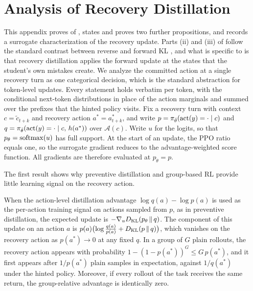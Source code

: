 \section{Analysis of Recovery Distillation}
\label{app:theory}

This appendix proves  of , states and proves two further propositions, and records a surrogate characterization of the recovery update. Parts (ii) and (iii) of  follow the standard contrast between reverse and forward KL \citep{agarwal2024gkd,gu2024minillm}, and what is specific to \method{} is that recovery distillation applies the forward update at the states that the student's own mistakes create. We analyze the committed action at a single recovery turn as one categorical decision, which is the standard abstraction for token-level updates. Every statement holds verbatim per token, with the conditional next-token distributions in place of the action marginals and summed over the prefixes that the hinted policy visits. Fix a recovery turn with context $c = \tilde{c}_{t+k}$ and recovery action $a^{*} = a^{*}_{t+k}$, and write $p = \pi_{\bar\theta}(\operatorname{act}(y) = \cdot \mid c)$ and $q = \pi_{\bar\theta}(\operatorname{act}(y) = \cdot \mid c,\, h(a^{*}))$ over $\mathcal{A}(c)$. Write $u$ for the logits, so that $p_\theta = \mathrm{softmax}(u)$ has full support. At the start of an update, the PPO ratio equals one, so the surrogate gradient reduces to the advantage-weighted score function. All gradients are therefore evaluated at $p_\theta = p$.

The first result shows why preventive distillation and group-based RL provide little learning signal on the recovery action.

\begin{proposition}
\label{prop:starvation}
When the action-level distillation advantage $\log q(a) - \log p(a)$ is used as the per-action training signal on actions sampled from $p$, as in preventive distillation, the expected update is $-\nabla_u D_{\mathrm{KL}}(p_\theta \,\|\, q)$. The component of this update on an action $a$ is $p(a)\bigl(\log\tfrac{q(a)}{p(a)} + D_{\mathrm{KL}}(p \,\|\, q)\bigr)$, which vanishes on the recovery action as $p(a^{*}) \to 0$ at any fixed $q$. In a group of $G$ plain rollouts, the recovery action appears with probability $1 - (1 - p(a^{*}))^{G} \le G\, p(a^{*})$, and it first appears after $1 / p(a^{*})$ plain samples in expectation, against $1 / q(a^{*})$ under the hinted policy. Moreover, if every rollout of the task receives the same return, the group-relative advantage is identically zero.
\end{proposition}

